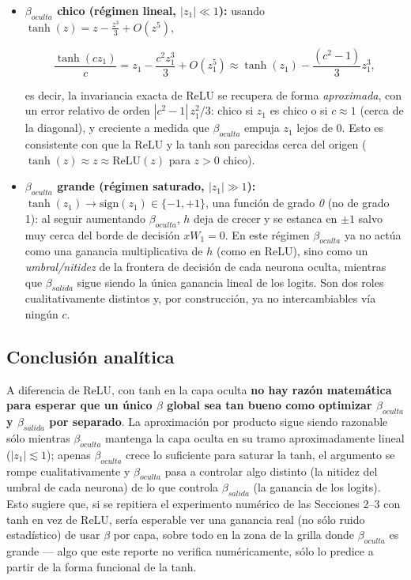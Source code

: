 \documentclass[11pt]{article}
\begin{document}
\begin{itemize}

\item \textbf{$\beta_{oculta}$ chico (régimen lineal, $|z_1|\ll 1$):} usando $\tanh(z)=z-\tfrac{z^3}{3}+O(z^5)$,

$$\frac{\tanh(cz_1)}{c} = z_1 - \frac{c^2 z_1^3}{3} + O(z_1^5) \approx \tanh(z_1) - \frac{(c^2-1)}{3}z_1^3,$$

es decir, la invariancia exacta de ReLU se recupera de forma \emph{aproximada}, con un error relativo de orden $|c^2-1|\,z_1^2/3$: chico si $z_1$ es chico o si $c\approx 1$ (cerca de la diagonal), y creciente a medida que $\beta_{oculta}$ empuja $z_1$ lejos de 0. Esto es consistente con que la ReLU y la tanh son parecidas cerca del origen ($\tanh(z)\approx z\approx\mathrm{ReLU}(z)$ para $z>0$ chico).

\item \textbf{$\beta_{oculta}$ grande (régimen saturado, $|z_1|\gg 1$):} $\tanh(z_1)\to\mathrm{sign}(z_1)\in\{-1,+1\}$, una función de grado \emph{0} (no de grado 1): al seguir aumentando $\beta_{oculta}$, $h$ deja de crecer y se estanca en $\pm 1$ salvo muy cerca del borde de decisión $xW_1=0$. En este régimen $\beta_{oculta}$ ya no actúa como una ganancia multiplicativa de $h$ (como en ReLU), sino como un \emph{umbral/nitidez} de la frontera de decisión de cada neurona oculta, mientras que $\beta_{salida}$ sigue siendo la única ganancia lineal de los logits. Son dos roles cualitativamente distintos y, por construcción, ya no intercambiables vía ningún $c$.

\end{itemize}

\subsection{Conclusión analítica}

A diferencia de ReLU, con tanh en la capa oculta \textbf{no hay razón matemática para esperar que un único $\beta$ global sea tan bueno como optimizar $\beta_{oculta}$ y $\beta_{salida}$ por separado}. La aproximación por producto sigue siendo razonable sólo mientras $\beta_{oculta}$ mantenga la capa oculta en su tramo aproximadamente lineal ($|z_1|\lesssim 1$); apenas $\beta_{oculta}$ crece lo suficiente para saturar la tanh, el argumento se rompe cualitativamente y $\beta_{oculta}$ pasa a controlar algo distinto (la nitidez del umbral de cada neurona) de lo que controla $\beta_{salida}$ (la ganancia de los logits). Esto sugiere que, si se repitiera el experimento numérico de las Secciones 2--3 con tanh en vez de ReLU, sería esperable ver una ganancia real (no sólo ruido estadístico) de usar $\beta$ por capa, sobre todo en la zona de la grilla donde $\beta_{oculta}$ es grande — algo que este reporte no verifica numéricamente, sólo lo predice a partir de la forma funcional de la tanh.
\end{document}
